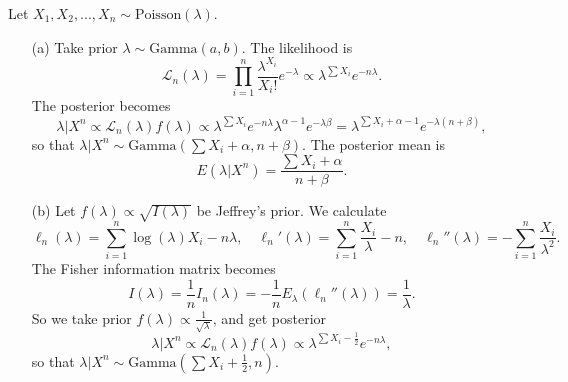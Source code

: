 Let $X_1, X_2, ..., X_n \sim \mathrm{Poisson}(\lambda)$.
\begin{itemize}
    \item[(a)] Take prior $\lambda \sim \mathrm{Gamma}(a, b)$.
        The likelihood is
        \begin{equation*}
            \mathcal{L}_n(\lambda) = \prod_{i = 1}^n \frac{\lambda^{X_i}}{X_i!} e^{-\lambda}
                \propto \lambda^{\sum X_i} e^{-n\lambda}.
        \end{equation*}
        The posterior becomes
        \begin{equation*}
            \lambda|X^n \propto \mathcal{L}_n(\lambda) f(\lambda)
                \propto \lambda^{\sum X_i} e^{-n\lambda} \lambda^{\alpha - 1} e^{-\lambda \beta}
                = \lambda^{\sum X_i + \alpha - 1} e^{-\lambda (n + \beta)},
        \end{equation*}
        so that $\lambda|X^n \sim \mathrm{Gamma}(\sum X_i + \alpha, n + \beta)$.
        The posterior mean is
        \begin{equation*}
            E(\lambda|X^n) = \frac{\sum X_i + \alpha}{n + \beta}.
        \end{equation*}
    \item[(b)] Let $f(\lambda) \propto \sqrt{I(\lambda)}$ be Jeffrey's prior.
        We calculate
        \begin{equation*}
            \ell_n(\lambda) = \sum_{i = 1}^n \log(\lambda) X_i - n \lambda, \quad
            \ell_n'(\lambda) = \sum_{i = 1}^n \frac{X_i}{\lambda} - n, \quad
            \ell_n''(\lambda) = -\sum_{i = 1}^n \frac{X_i}{\lambda^2}.
        \end{equation*}
        The Fisher information matrix becomes
        \begin{equation*}
            I(\lambda) = \frac{1}{n} I_n(\lambda)
                = -\frac{1}{n} E_{\lambda}(\ell_n''(\lambda))
                = \frac{1}{\lambda}.
        \end{equation*}
        So we take prior $f(\lambda) \propto \frac{1}{\sqrt{\lambda}}$, and get posterior
        \begin{equation*}
            \lambda|X^n \propto \mathcal{L}_n(\lambda) f(\lambda)
                \propto \lambda^{\sum X_i - \frac{1}{2}} e^{-n\lambda},
        \end{equation*}
        so that $\lambda|X^n \sim \mathrm{Gamma}\left(\sum X_i + \frac{1}{2}, n\right)$.
\end{itemize}
